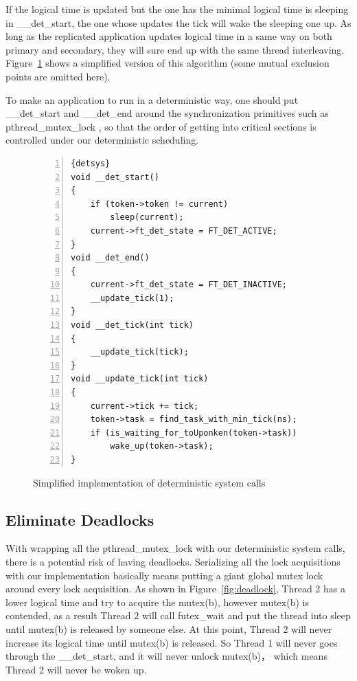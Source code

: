 If the logical time is updated but the one has the minimal logical time is sleeping in \_\_det\_start, the one whose updates the tick will wake the sleeping one up. As long as the replicated application updates logical time in a same way on both primary and secondary, they will sure end up with the same thread interleaving. Figure~\ref{f:algorithm} shows a simplified version of this algorithm (some mutual exclusion points are omitted here).

To make an application to run in a deterministic way, one should put \_\_det\_start and \_\_det\_end around the synchronization primitives such as pthread\_mutex\_lock , so that the order of getting into critical sections is controlled under our deterministic scheduling.


\begin{figure}
\begin{lstlisting}[numbers=left, frame=single, basicstyle=\small, breaklines]{detsys}
void __det_start()
{
    if (token->token != current)
        sleep(current);
    current->ft_det_state = FT_DET_ACTIVE;        
}
void __det_end()
{
    current->ft_det_state = FT_DET_INACTIVE;
    __update_tick(1);
}
void __det_tick(int tick)
{
    __update_tick(tick);
}
void __update_tick(int tick)
{
    current->tick += tick;
    token->task = find_task_with_min_tick(ns);
    if (is_waiting_for_toUponken(token->task))
    	wake_up(token->task);
}
\end{lstlisting}
\caption{Simplified implementation of deterministic system calls}
\label{f:algorithm}
\end{figure}


\subsection{Eliminate Deadlocks} \label{sec:edeadlock}
With wrapping all the pthread\_mutex\_lock with our deterministic system calls, there is a potential risk of having deadlocks. Serializing all the lock acquisitions with our implementation basically means putting a giant global mutex lock around every lock acquisition. As shown in Figure~\ref{fig:deadlock}, Thread 2 has a lower logical time and try to acquire the mutex(b), however mutex(b) is contended, as a result Thread 2 will call futex\_wait and put the thread into sleep until mutex(b) is released by someone else. At this point, Thread 2 will never increase its logical time until mutex(b) is released. So Thread 1 will never goes through the \_\_det\_start, and it will never unlock mutex(b)， which means Thread 2 will never be woken up.

